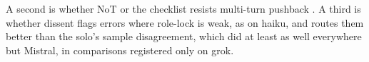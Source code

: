 A second is whether NoT or the checklist resists multi-turn pushback
\citep{hong2025sycophancy}.
A third is whether dissent flags errors where
role-lock is weak, as on haiku, and routes them better than the solo's
sample disagreement,
which did at least as well everywhere but Mistral,
in comparisons registered only on grok.
